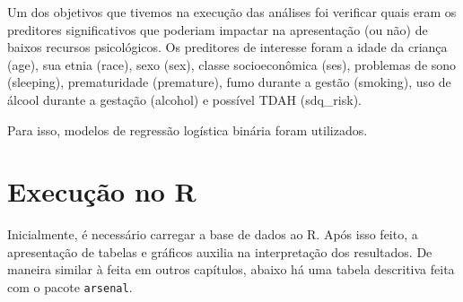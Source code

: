 \documentclass[
]{book}
\newenvironment{Shaded}{\begin{snugshade}}{\end{snugshade}}
\newcommand{\DataTypeTok}[1]{\textcolor[rgb]{0.13,0.29,0.53}{#1}}
\newcommand{\KeywordTok}[1]{\textcolor[rgb]{0.13,0.29,0.53}{\textbf{#1}}}
\newcommand{\NormalTok}[1]{#1}
\newcommand{\OperatorTok}[1]{\textcolor[rgb]{0.81,0.36,0.00}{\textbf{#1}}}
\newcommand{\OtherTok}[1]{\textcolor[rgb]{0.56,0.35,0.01}{#1}}
\newcommand{\StringTok}[1]{\textcolor[rgb]{0.31,0.60,0.02}{#1}}
\begin{document}
Um dos objetivos que tivemos na execução das análises foi verificar quais eram os preditores significativos que poderiam impactar na apresentação (ou não) de baixos recursos psicológicos. Os preditores de interesse foram a idade da criança (age), sua etnia (race), sexo (sex), classe socioeconômica (ses), problemas de sono (sleeping), prematuridade (premature), fumo durante a gestão (smoking), uso de álcool durante a gestação (alcohol) e possível TDAH (sdq\_risk).

Para isso, modelos de regressão logística binária foram utilizados.

\hypertarget{execuuxe7uxe3o-no-r-16}{%
\section{Execução no R}\label{execuuxe7uxe3o-no-r-16}}

Inicialmente, é necessário carregar a base de dados ao R. Após isso feito, a apresentação de tabelas e gráficos auxilia na interpretação dos resultados. De maneira similar à feita em outros capítulos, abaixo há uma tabela descritiva feita com o pacote \texttt{arsenal}.

\begin{Shaded}
\end{Shaded}
\end{document}
